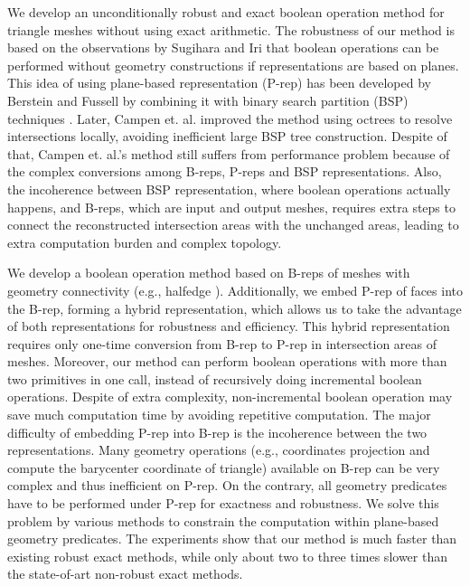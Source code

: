 \documentclass[10pt,journal,compsoc]{IEEEtran}
\begin{document}
We develop an unconditionally robust and exact boolean operation method for triangle meshes without using exact arithmetic. The robustness of our method is based on the observations by Sugihara and Iri \cite{sugihara1990solid} that boolean operations can be performed without geometry constructions if representations are based on planes. This idea of using plane-based representation (P-rep) has been developed by Berstein and Fussell \cite{bernstein2009fast} by combining it with binary search partition (BSP) techniques \cite{naylor1990merging,thibault1987set}. Later, Campen et. al. \cite{campen2010exact} improved the method using octrees to resolve intersections locally, avoiding inefficient large BSP tree construction. Despite of that, Campen et. al.'s method still suffers from performance problem because of the complex conversions among B-reps, P-reps and BSP representations. Also, the incoherence between BSP representation, where boolean operations actually happens, and B-reps, which are input and output meshes, requires extra steps to connect the reconstructed intersection areas with the unchanged areas, leading to extra computation burden and complex topology.

We develop a boolean operation method based on B-reps of meshes with geometry connectivity (e.g., halfedge \cite{mcguire2000half}). Additionally, we embed P-rep of faces into the B-rep, forming a hybrid representation, which allows us to take the advantage of both representations for robustness and efficiency. This hybrid representation requires only one-time conversion from B-rep to P-rep in intersection areas of meshes.
Moreover, our method can perform boolean operations with more than two primitives in one call, instead of recursively doing incremental boolean operations. Despite of extra complexity, non-incremental boolean operation may save much computation time by avoiding repetitive computation. The major difficulty of embedding P-rep into B-rep is the incoherence between the two representations. Many geometry operations (e.g., coordinates projection and compute the barycenter coordinate of triangle) available on B-rep can be very complex and thus inefficient on P-rep. On the contrary, all geometry predicates have to be performed under P-rep for exactness and robustness. We solve this problem by various methods to constrain the computation within plane-based geometry predicates. The experiments show that our method is much faster than existing robust exact methods, while only about two to three times slower than the state-of-art non-robust exact methods.
\end{document}
